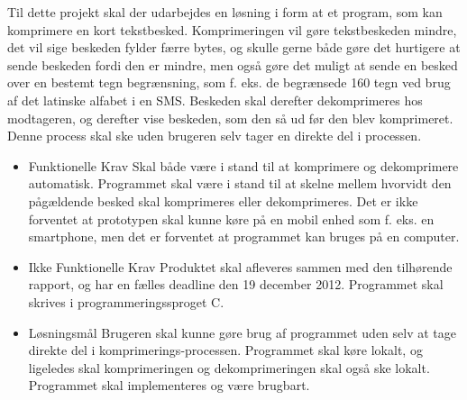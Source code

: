 Til dette projekt skal der udarbejdes en løsning i form at et program, som kan komprimere en kort tekstbesked. Komprimeringen vil gøre tekstbeskeden mindre, det vil sige beskeden fylder færre bytes, og skulle gerne både gøre det hurtigere at sende beskeden fordi den er mindre, men også gøre det muligt at sende en besked over en bestemt tegn begrænsning, som f. eks. de begrænsede 160 tegn ved brug af det latinske alfabet i en SMS. Beskeden skal derefter dekomprimeres hos modtageren, og derefter vise beskeden, som den så ud før den blev komprimeret. Denne process skal ske uden brugeren selv tager en direkte del i processen.

\begin {itemize}
\item Funktionelle Krav
\subitem Skal både være i stand til at komprimere og dekomprimere automatisk.
\subitem Programmet skal være i stand til at skelne mellem hvorvidt den pågældende besked skal komprimeres eller dekomprimeres.
\subitem Det er ikke forventet at prototypen skal kunne køre på en mobil enhed som f. eks. en smartphone, men det er forventet at programmet kan bruges på en computer.

\item Ikke Funktionelle Krav
\subitem Produktet skal afleveres sammen med den tilhørende rapport, og har en fælles deadline den 19 december 2012.
\subitem Programmet skal skrives i programmeringssproget C.

\item Løsningsmål
\subitem Brugeren skal kunne gøre brug af programmet uden selv at tage direkte del i komprimerings-processen.
\subitem Programmet skal køre lokalt, og ligeledes skal komprimeringen og dekomprimeringen skal også ske lokalt.
\subitem Programmet skal implementeres og være brugbart.
\end{itemize}
